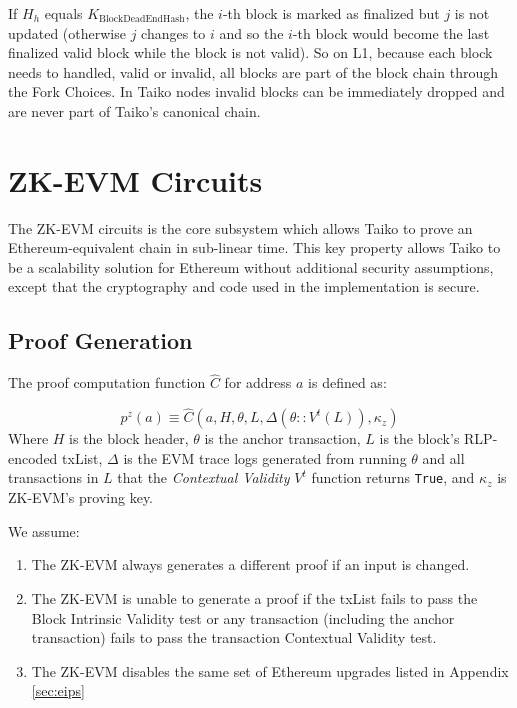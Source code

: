 \documentclass[9pt,oneside]{amsart}
\begin{document}
\begin{multicols}{2}
If $H_h$ equals $K_{\mathrm{BlockDeadEndHash}}$, the $i$-th block is marked as finalized but $j$ is not updated (otherwise $j$ changes to $i$ and so the $i$-th block would become the last finalized valid block while the block is not valid). So on L1, because each block needs to handled, valid or invalid, all blocks are part of the block chain through the Fork Choices. In Taiko nodes invalid blocks can be immediately dropped and are never part of Taiko's canonical chain.

\section{ZK-EVM Circuits}

The ZK-EVM circuits is the core subsystem which allows Taiko to prove an Ethereum-equivalent chain in sub-linear time. This key property allows Taiko to be a scalability solution for Ethereum without additional security assumptions, except that the cryptography and code used in the implementation is secure.

\subsection{Proof Generation} The proof computation function $\hat{C}$ for address $a$ is defined as:

\begin{equation}
    p^z(a) \equiv \hat{C}(a, H,\theta, L, \Delta(\theta::V^t(L)),\kappa_z )
\end{equation}
Where $H$ is the block header, $\theta$ is the anchor transaction, $L$ is the block's RLP-encoded txList, $\Delta$ is the EVM trace logs generated from running $\theta$ and all transactions in $L$ that the \textit{Contextual Validity} $V^t$ function returns \texttt{True}, and $\kappa_z$ is  ZK-EVM's proving key.

We assume:
\begin{enumerate}
\item The ZK-EVM always generates a different proof if an input is changed.
\item The ZK-EVM is unable to generate a proof if the txList fails to pass the Block Intrinsic Validity test or any transaction (including the anchor transaction) fails to pass the transaction Contextual Validity test.
\item The ZK-EVM disables the same set of Ethereum upgrades listed in Appendix \ref{sec:eips}
\end{enumerate}


\end{multicols}
\end{document}
